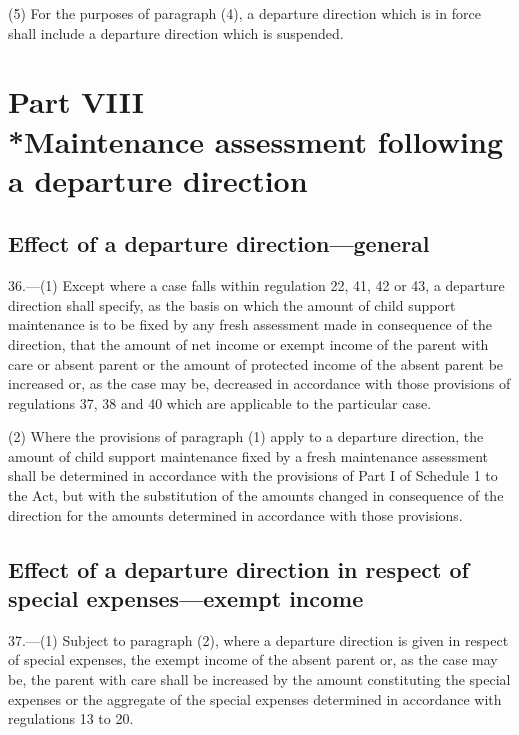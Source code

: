\documentclass[a4paper]{article}
\newcommand{\parthead}{}
\begin{document}
(5) For the purposes of paragraph (4), a departure direction which is in force
shall include a departure direction which is suspended.

\section[Part VIII --- Maintenance assessment following a departure direction]{Part VIII\\*Maintenance assessment following a departure direction}

\renewcommand\parthead{--- Part VIII}

\subsection[36. Effect of a
departure direction—general]{Effect of a
departure direction—general}

36.—(1) Except where a case falls within regulation
22, 41, 42 or 43, a departure direction shall specify, as the basis on which the
amount of child support maintenance is to be fixed by any fresh assessment made
in consequence of the direction, that the amount of net income or exempt income
of the parent with care or absent parent or the amount of protected income of
the absent parent be increased or, as the case may be, decreased in accordance
with those provisions of regulations 37, 38 and 40 which are applicable to the
particular case.

(2) Where the provisions of paragraph (1) apply to a departure direction, the
amount of child support maintenance fixed by a fresh maintenance assessment
shall be determined in accordance with the provisions of Part I of Schedule 1 to
the Act, but with the substitution of the amounts changed in consequence of the
direction for the amounts determined in accordance with those provisions.

\subsection[37. Effect of a departure direction in respect of special expenses—exempt
income]{Effect of a departure direction in respect of special expenses—exempt
income}

37.—(1) Subject to paragraph (2), where a departure direction is given in
respect of special expenses, the exempt income of the absent parent or, as the
case may be, the parent with care shall be increased by the amount constituting
the special expenses or the aggregate of the special expenses determined in
accordance with regulations 13 to 20.
\end{document}
